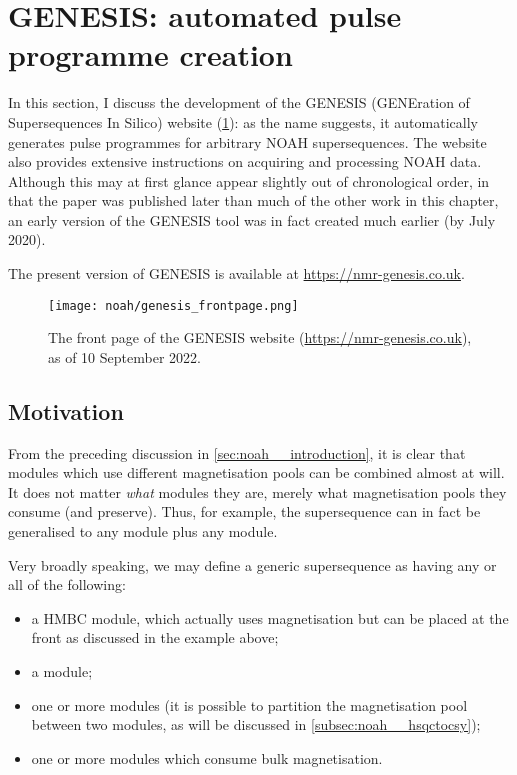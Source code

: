 \section{GENESIS: automated pulse programme creation}
\label{sec:noah__genesis}

In this section, I discuss the development of the GENESIS (GENEration of Supersequences In Silico) website (\cref{fig:genesis_frontpage}): as the name suggests, it automatically generates pulse programmes for arbitrary NOAH supersequences.
The website also provides extensive instructions on acquiring and processing NOAH data.
Although this may at first glance appear slightly out of chronological order, in that the paper\autocite{Yong2022AC} was published later than much of the other work in this chapter, an early version of the GENESIS tool was in fact created much earlier (by July 2020).

The present version of GENESIS is available at \url{https://nmr-genesis.co.uk}.

\begin{figure}[!ht]
    \centering
    \texttt{[image: noah/genesis\_frontpage.png]}%
    \caption[Front page of the GENESIS website]{
        The front page of the GENESIS website (\url{https://nmr-genesis.co.uk}), as of 10 September 2022.
    }
    \label{fig:genesis_frontpage}
\end{figure}

\subsection{Motivation}
\label{subsec:noah__genesis_motivation}

From the preceding discussion in \cref{sec:noah__introduction}, it is clear that modules which use different magnetisation pools can be combined almost at will.
It does not matter \textit{what} modules they are, merely what magnetisation pools they consume (and preserve).
Thus, for example, the  supersequence can in fact be generalised to any  module plus any  module.

Very broadly speaking, we may define a generic supersequence as having any or all of the following:

\begin{itemize}
    \item a HMBC module, which actually uses  magnetisation but can be placed at the front as discussed in the  example above;
    \item a  module;
    \item one or more  modules (it is possible to partition the  magnetisation pool between two modules, as will be discussed in \cref{subsec:noah__hsqctocsy});
    \item one or more  modules which consume bulk magnetisation.
\end{itemize}


